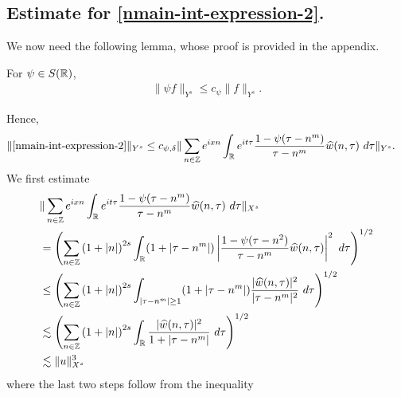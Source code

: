 \subsection{Estimate for \eqref{nmain-int-expression-2}.}
We now need the following lemma, whose proof is provided in the appendix.
%
%
%
%
%
%
%
%
\begin{lemma}
\label{nlem:schwartz-mult}
	For $\psi \in S(\mathbb{R})$,
%
%
\begin{equation}
	\label{nschwartz-mult}
	\begin{split}
		\|\psi f \|_{Y^s} \le c_{\psi} \|f \|_{Y^s}.
	\end{split}
\end{equation}
%
%
\end{lemma}
%
%
Hence,
%
%
\begin{equation}
  \label{nyu}
	\begin{split}
		\|\eqref{nmain-int-expression-2}\|_{Y^s} 
    & \le c_{\psi, \delta}
		\| \sum_{n \in \zz} e^{ixn} \int_\rr 
		e^{it \tau} \frac{ 1 - \psi (\tau - n^{m} ) 
		}{\tau - n^{m}} \wh{w}(n, \tau) \ 
		d \tau\|_{Y^s}.
			\end{split}
\end{equation}
%
We first estimate
%
%
\begin{equation}
\label{nmain-int2-est-X-s-part}
\begin{split}
  & \| \sum_{n \in \zz} e^{ixn} \int_\rr 
		e^{it \tau} \frac{ 1 - \psi (\tau - n^{m} ) 
		}{\tau - n^{m}} \wh{w}(n, \tau) \ 
		d \tau\|_{X^s}
		\\
    & = \left( \sum_{n \in \zz} \left (1 + |n| \right )^{2s} \int_\rr
		(1 + |\tau - n^{m}|) \left | \frac{1 - \psi(\tau - n^{2 
		})}{\tau - n^{m}} 
		\wh{w}(n, \tau) \right |^2 \ d 
		\tau \right)^{1/2}
		\\
		& \le \left( \sum_{n \in \zz} \left (1 + |n| \right )^{2s} \int_{| \tau - n^{m }| \ge 1}
		(1 + |\tau - n^{m}|) \frac{|\wh{w}(n, \tau)|^2 }{|\tau - n^{m }|^2} 
		\ d 
		\tau \right)^{1/2}
		\\
		& \lesssim  \left( \sum_{n \in 
		\zz} \left (1 + |n| \right )^{2s} \int_\rr
		\frac{|\wh{w}(n, \tau) |^2}{1+ |\tau - 
		n^{m}|} 
		 \ d \tau 
		\right)^{1/2}
		\\
		& \lesssim  \|u\|_{X^s}^3
\end{split}
\end{equation}
%
%
%
where the last two steps follow from the inequality 
